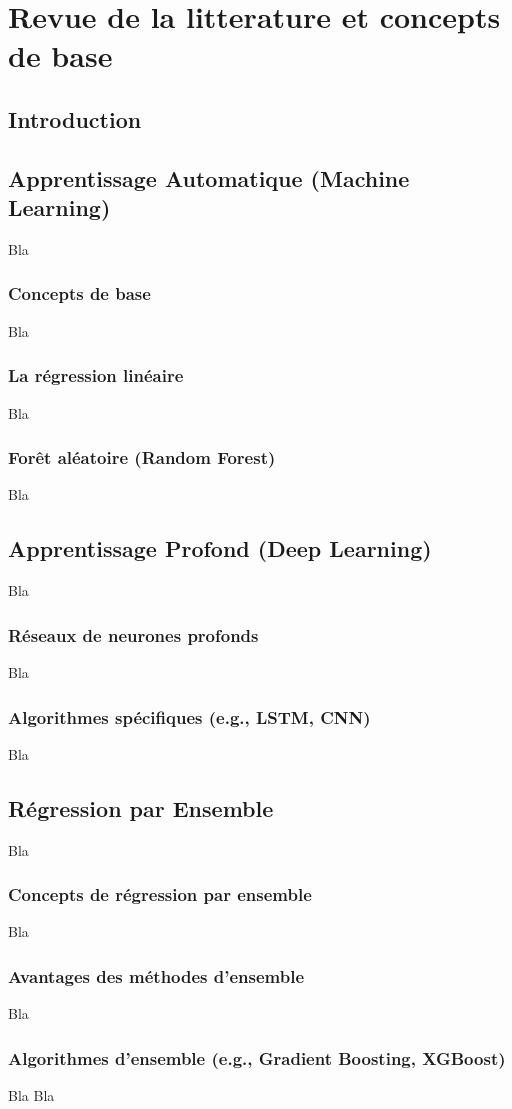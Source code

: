 \chapter{Revue de la litterature et concepts de base}

\section{Introduction}

\section{Apprentissage Automatique (Machine Learning)}

Bla

\subsection{Concepts de base}

Bla

\subsection{La régression linéaire}

Bla

\subsection{Forêt aléatoire (Random Forest)}

Bla

\section{Apprentissage Profond (Deep Learning)}

Bla

\subsection{Réseaux de neurones profonds}

Bla

\subsection{Algorithmes spécifiques (e.g., LSTM, CNN)}

Bla

\section{Régression par Ensemble}

Bla

\subsection{Concepts de régression par ensemble}

Bla

\subsection{Avantages des méthodes d'ensemble}

Bla

\subsection{Algorithmes d'ensemble (e.g., Gradient Boosting, XGBoost)}

Bla Bla